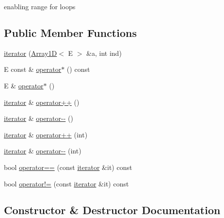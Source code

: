 enabling range for loops \subsection*{Public Member Functions}
\begin{DoxyCompactItemize}
\item 
\hyperlink{classbridges_1_1datastructure_1_1_array1_d_1_1iterator_a5bfe7e8948825c5814a95b05551496e4}{iterator} (\hyperlink{classbridges_1_1datastructure_1_1_array1_d}{Array1D}$<$ E $>$ \&a, int ind)
\item 
E const  \& \hyperlink{classbridges_1_1datastructure_1_1_array1_d_1_1iterator_a847f7a113b05007499eac3dca011ba5d}{operator$\ast$} () const
\item 
E \& \hyperlink{classbridges_1_1datastructure_1_1_array1_d_1_1iterator_aa95730146a48c7d753334fdcfddfbd84}{operator$\ast$} ()
\item 
\hyperlink{classbridges_1_1datastructure_1_1_array1_d_1_1iterator}{iterator} \& \hyperlink{classbridges_1_1datastructure_1_1_array1_d_1_1iterator_a1d8394de4e75cf1dffd1465beba2f85a}{operator++} ()
\item 
\hyperlink{classbridges_1_1datastructure_1_1_array1_d_1_1iterator}{iterator} \& \hyperlink{classbridges_1_1datastructure_1_1_array1_d_1_1iterator_ae63ca794e437c96e713a5c51844766f9}{operator-\/-\/} ()
\item 
\hyperlink{classbridges_1_1datastructure_1_1_array1_d_1_1iterator}{iterator} \& \hyperlink{classbridges_1_1datastructure_1_1_array1_d_1_1iterator_a113e2d57db9888db18681558b6ddd4c2}{operator++} (int)
\item 
\hyperlink{classbridges_1_1datastructure_1_1_array1_d_1_1iterator}{iterator} \& \hyperlink{classbridges_1_1datastructure_1_1_array1_d_1_1iterator_a600898496da4155d0c58399cf9d1b4cf}{operator-\/-\/} (int)
\item 
bool \hyperlink{classbridges_1_1datastructure_1_1_array1_d_1_1iterator_a59e1cdad748d872e7d07a26009a5a596}{operator==} (const \hyperlink{classbridges_1_1datastructure_1_1_array1_d_1_1iterator}{iterator} \&it) const
\item 
bool \hyperlink{classbridges_1_1datastructure_1_1_array1_d_1_1iterator_ab9e885078d2bb6068efa5ef899b7e32b}{operator!=} (const \hyperlink{classbridges_1_1datastructure_1_1_array1_d_1_1iterator}{iterator} \&it) const
\end{DoxyCompactItemize}


\subsection{Constructor \& Destructor Documentation}
\mbox{\label{classbridges_1_1datastructure_1_1_array1_d_1_1iterator_a5bfe7e8948825c5814a95b05551496e4}} 
